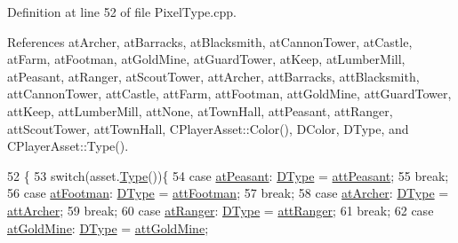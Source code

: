 Definition at line 52 of file Pixel\+Type.\+cpp.



References at\+Archer, at\+Barracks, at\+Blacksmith, at\+Cannon\+Tower, at\+Castle, at\+Farm, at\+Footman, at\+Gold\+Mine, at\+Guard\+Tower, at\+Keep, at\+Lumber\+Mill, at\+Peasant, at\+Ranger, at\+Scout\+Tower, att\+Archer, att\+Barracks, att\+Blacksmith, att\+Cannon\+Tower, att\+Castle, att\+Farm, att\+Footman, att\+Gold\+Mine, att\+Guard\+Tower, att\+Keep, att\+Lumber\+Mill, att\+None, at\+Town\+Hall, att\+Peasant, att\+Ranger, att\+Scout\+Tower, att\+Town\+Hall, C\+Player\+Asset\+::\+Color(), D\+Color, D\+Type, and C\+Player\+Asset\+::\+Type().


\begin{DoxyCode}
52                                                \{
53     \textcolor{keywordflow}{switch}(asset.\hyperlink{classCPlayerAsset_a6d6aeea4e8b02e0f239bac95db6d9e0a}{Type}())\{
54         \textcolor{keywordflow}{case} \hyperlink{GameDataTypes_8h_a5600d4fc433b83300308921974477fecaf5e570c7e5a2266810f610e7f945ea61}{atPeasant}:         \hyperlink{classCPixelType_aca37f042b510a349e0d3209c73ae51c5}{DType} = \hyperlink{classCPixelType_af06457fd1c2ff34c67ce670e633a10b0af3b74938163bde519db7dd237b6c961c}{attPeasant};
55                                 \textcolor{keywordflow}{break};
56         \textcolor{keywordflow}{case} \hyperlink{GameDataTypes_8h_a5600d4fc433b83300308921974477fecad586e8ff9ee846d22630c2066e8fb7c2}{atFootman}:         \hyperlink{classCPixelType_aca37f042b510a349e0d3209c73ae51c5}{DType} = \hyperlink{classCPixelType_af06457fd1c2ff34c67ce670e633a10b0a9cabf089061719daca16011723f73111}{attFootman};
57                                 \textcolor{keywordflow}{break};
58         \textcolor{keywordflow}{case} \hyperlink{GameDataTypes_8h_a5600d4fc433b83300308921974477feca7fad0074234068ff0af4092a75b929f8}{atArcher}:          \hyperlink{classCPixelType_aca37f042b510a349e0d3209c73ae51c5}{DType} = \hyperlink{classCPixelType_af06457fd1c2ff34c67ce670e633a10b0a8461613b147d9c5e6caf3dc708cd08bf}{attArcher};
59                                 \textcolor{keywordflow}{break};
60         \textcolor{keywordflow}{case} \hyperlink{GameDataTypes_8h_a5600d4fc433b83300308921974477fecaafd2b1e0ca34872bb06098dbec9939e0}{atRanger}:          \hyperlink{classCPixelType_aca37f042b510a349e0d3209c73ae51c5}{DType} = \hyperlink{classCPixelType_af06457fd1c2ff34c67ce670e633a10b0ac23c50eea82d4a69b44ab664145d273e}{attRanger};
61                                 \textcolor{keywordflow}{break};
62         \textcolor{keywordflow}{case} \hyperlink{GameDataTypes_8h_a5600d4fc433b83300308921974477feca243d9ba44092eadd561db058d742b3b3}{atGoldMine}:        \hyperlink{classCPixelType_aca37f042b510a349e0d3209c73ae51c5}{DType} = \hyperlink{classCPixelType_af06457fd1c2ff34c67ce670e633a10b0a1d73b839836a167025b789cbbb8edefd}{attGoldMine};

\end{DoxyCode}
